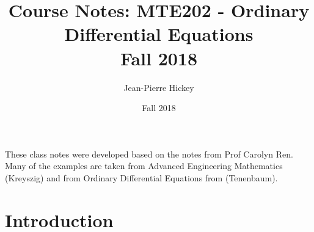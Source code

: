 \documentclass[12pt,twoside]{memoir}
\author{Jean-Pierre Hickey}
\title{Course Notes: MTE202 - Ordinary Differential Equations\\ {\normalsize Fall 2018}}
\date{Fall 2018}
\makeatletter
\theoremstyle{definition}
\def\maketitle{%
  \null
  \thispagestyle{empty}%
  \vfill
  \begin{center}\leavevmode
    \normalfont
    {\LARGE\raggedleft \@author\par}%
    \hrulefill\par
    {\huge\raggedright \@title\par}%
    \vskip 1cm
  \end{center}%
  \vfill
  \null
  \cleardoublepage
  }
\makeatother
\begin{document}
\let\cleardoublepage\clearpage


\maketitle






\frontmatter

\null\vfill

\begin{flushleft}


\bigskip





These class notes were developed based on the notes from Prof Carolyn Ren. Many of the examples are taken from Advanced Engineering Mathematics (Kreyszig) and from Ordinary Differential Equations from (Tenenbaum).




\end{flushleft}

\mainmatter
\sloppy



\chapter{Introduction}




































\end{document}
